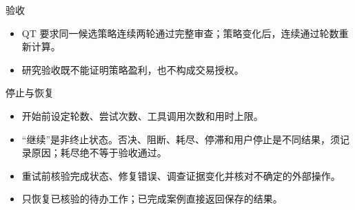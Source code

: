 \begin{frame}{验收}
\begin{center}
\resizebox{.95\textwidth}{!}{}
\end{center}
\begin{itemize}
\item QT 要求同一候选策略连续两轮通过完整审查；策略变化后，连续通过轮数重新计算。
\item 研究验收既不能证明策略盈利，也不构成交易授权。
\end{itemize}
\end{frame}
\begin{frame}{停止与恢复}
\setlength{\topsep}{0pt}
\begin{center}\resizebox{.90\textwidth}{!}{}\end{center}
\begin{itemize}
\item 开始前设定轮数、尝试次数、工具调用次数和用时上限。
\item “继续”是非终止状态。否决、阻断、耗尽、停滞和用户停止是不同结果，须记录原因；耗尽绝不等于验收通过。
\item 重试前核验完成状态、修复错误、调查证据变化并核对不确定的外部操作。
\item 只恢复已核验的待办工作；已完成案例直接返回保存的结果。
\end{itemize}
\end{frame}
